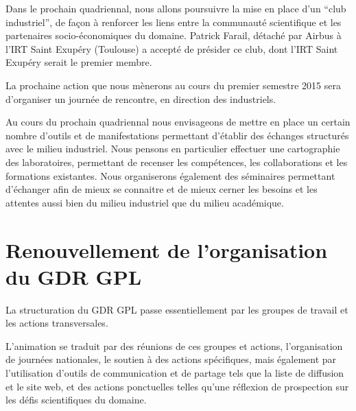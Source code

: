 \documentclass[11pt]{article}
\begin{document}
Dans le prochain quadriennal, nous allons poursuivre la mise en place d'un
``club industriel'', de façon à renforcer les liens entre la communauté
scientifique et les partenaires socio-économiques du domaine. 
Patrick Farail, détaché par Airbus à l'IRT Saint Exupéry (Toulouse) a accepté
de présider ce club, dont l'IRT Saint Exupéry serait le premier membre.

La prochaine action que nous mènerons au cours du premier semestre 2015 sera
d'organiser un journée de rencontre, en direction des industriels.

Au cours du prochain quadriennal nous envisageons de mettre en place un certain
nombre d'outils et de manifestations permettant d'établir des échanges
structurés avec le milieu industriel. Nous pensons en particulier effectuer une
cartographie des laboratoires, permettant de recenser les compétences, les
collaborations et les formations existantes.
Nous organiserons également des séminaires permettant d'échanger afin de mieux
se connaitre et de mieux cerner les besoins et les attentes aussi bien du
milieu industriel que du milieu académique.





\section{Renouvellement de l'organisation du GDR GPL}\label{organisation}

La structuration du GDR GPL passe essentiellement 
par les groupes de travail et les actions transversales.


L'animation se traduit 
    par des réunions de ces groupes et actions,  
    l'organisation de journées nationales, 
    le soutien à des actions spécifiques, 
    mais également par l'utilisation d'outils de communication
    et de partage tels que la liste de diffusion et le site web, et des actions ponctuelles telles qu'une réflexion de prospection sur les défis scientifiques du domaine. 
\end{document}

